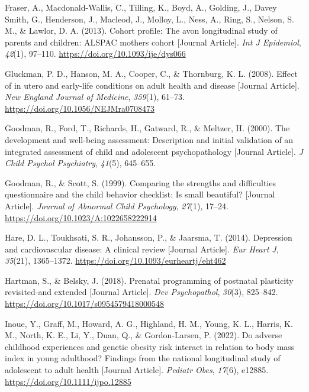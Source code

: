 \documentclass[
  letterpaper,
  DIV=11,
  numbers=noendperiod]{scrreport}
\newlength{\cslhangindent}
\newenvironment{CSLReferences}[2] %
 {\begin{list}{}{%
  \setlength{\itemindent}{0pt}
  \setlength{\leftmargin}{0pt}
  \setlength{\parsep}{0pt}
  \ifodd #1
   \setlength{\leftmargin}{\cslhangindent}
   \setlength{\itemindent}{-1\cslhangindent}
  \fi
  \setlength{\itemsep}{#2\baselineskip}}}
 {\end{list}}
\begin{document}
\begin{CSLReferences}{1}{0}
Fraser, A., Macdonald-Wallis, C., Tilling, K., Boyd, A., Golding, J.,
Davey Smith, G., Henderson, J., Macleod, J., Molloy, L., Ness, A., Ring,
S., Nelson, S. M., \& Lawlor, D. A. (2013). Cohort profile: The avon
longitudinal study of parents and children: ALSPAC mothers cohort
{[}Journal Article{]}. \emph{Int J Epidemiol}, \emph{42}(1), 97--110.
\url{https://doi.org/10.1093/ije/dys066}

Gluckman, P. D., Hanson, M. A., Cooper, C., \& Thornburg, K. L. (2008).
Effect of in utero and early-life conditions on adult health and disease
{[}Journal Article{]}. \emph{New England Journal of Medicine},
\emph{359}(1), 61--73. \url{https://doi.org/10.1056/NEJMra0708473}

Goodman, R., Ford, T., Richards, H., Gatward, R., \& Meltzer, H. (2000).
The development and well-being assessment: Description and initial
validation of an integrated assessment of child and adolescent
psychopathology {[}Journal Article{]}. \emph{J Child Psychol
Psychiatry}, \emph{41}(5), 645--655.

Goodman, R., \& Scott, S. (1999). Comparing the strengths and
difficulties questionnaire and the child behavior checklist: Is small
beautiful? {[}Journal Article{]}. \emph{Journal of Abnormal Child
Psychology}, \emph{27}(1), 17--24.
\url{https://doi.org/10.1023/A:1022658222914}

Hare, D. L., Toukhsati, S. R., Johansson, P., \& Jaarsma, T. (2014).
Depression and cardiovascular disease: A clinical review {[}Journal
Article{]}. \emph{Eur Heart J}, \emph{35}(21), 1365--1372.
\url{https://doi.org/10.1093/eurheartj/eht462}

Hartman, S., \& Belsky, J. (2018). Prenatal programming of postnatal
plasticity revisited-and extended {[}Journal Article{]}. \emph{Dev
Psychopathol}, \emph{30}(3), 825--842.
\url{https://doi.org/10.1017/s0954579418000548}

Inoue, Y., Graff, M., Howard, A. G., Highland, H. M., Young, K. L.,
Harris, K. M., North, K. E., Li, Y., Duan, Q., \& Gordon-Larsen, P.
(2022). Do adverse childhood experiences and genetic obesity risk
interact in relation to body mass index in young adulthood? Findings
from the national longitudinal study of adolescent to adult health
{[}Journal Article{]}. \emph{Pediatr Obes}, \emph{17}(6), e12885.
\url{https://doi.org/10.1111/ijpo.12885}


\end{CSLReferences}
\end{document}
